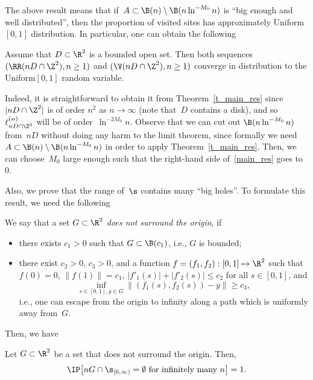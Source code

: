 The above result means that if~$A\subset \B(n)\setminus \B(n\ln^{-M_0}n)$ is ``big enough and well distributed'', then the proportion of visited sites has approximately Uniform$[0,1]$ distribution. In particular, one can obtain the following

\begin{coro}\label{cor_open}
Assume that $D\subset \R^2$ is a bounded open set. Then both sequences $(\RR(nD\cap\Z^2),n\geq 1)$ and $(\V(nD\cap\Z^2),n\geq 1)$ converge in distribution to the Uniform$[0,1]$ random variable.
\end{coro}

Indeed, it is straightforward to obtain it from Theorem~\ref{t_main_res} since $|nD\cap\Z^2|$ is of order $n^2$ as $n\to\infty$ (note that~$D$ contains a disk), and so $\ell^{(n)}_{nD\cap\Z^2}$ will be of order~$\ln^{-2M_0}n$. Observe that we can cut out $\B(n\ln^{-M_0}n)$ from~$nD$ without doing any harm to the limit theorem, since formally we need $A\subset \B(n)\setminus \B(n\ln^{-M_0}n)$ in order to apply Theorem~\ref{t_main_res}. Then, we can choose~$M_0$ large enough such that the right-hand side of~\eqref{main_res} goes to~$0$.

Also, we prove that the range of~$\s$ contains many ``big holes''. To formulate this result, we need the following

\begin{defi}\label{df_surround}
We say that a set $G\subset \R^2$ \emph{does not surround the origin}, if
\begin{itemize}
\item there exists $c_1>0$ such that $G\subset\B(c_1)$, i.e., $G$ is bounded;
\item there exist $c_2>0$, $c_3>0$, and a function $f=(f_1,f_2): [0,1]\mapsto \R^2$ such that $f(0)=0$, $\|f(1)\|= c_1$, $|f'_1(s)|+|f'_2(s)|\leq c_2$ for all $s\in [0,1]$, and
\[
\inf_{s\in[0,1], y\in G} \|(f_1(s),f_2(s))-y\|\geq c_3,
\]
i.e., one can escape from the origin to infinity along a path which is uniformly away from~$G$.
\end{itemize}
\end{defi}

Then, we have

\begin{theo}\label{t_bigholes}
Let $G\subset \R^2$ be a set that does not surround the origin. Then,
\begin{equation}\label{eq_bigholes}
\IP\big[nG\cap \s_{[0,\infty)} = \emptyset
\text{ for infinitely many }n\big] = 1.
\end{equation}
\end{theo}

